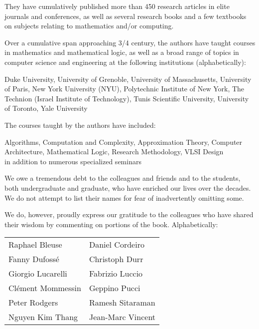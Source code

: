 \medskip

\noindent
They have cumulatively published more than 450 research articles in elite journals and conferences, as well as several research books and a few textbooks on subjects relating to
mathematics and/or computing.

\bigskip

Over a cumulative span approaching 3/4 century, the authors have taught courses in mathematics and mathematical logic, as well as a broad range of topics in computer science and engineering at the following institutions (alphabetically):

\smallskip

\noindent
Duke University, 
University of Grenoble,
University of Massachusetts,
University of Paris,
New York University (NYU),
Polytechnic Institute of New York,
The Technion (Israel Institute of Technology),
Tunis Scientific University,
University of Toronto,
Yale University

\medskip

\noindent
The courses taught by the authors have included:

\smallskip

\noindent
Algorithms,
Computation and Complexity, Approximation Theory,
Computer Architecture,
Mathematical Logic,
Research Methodology,
VLSI Design \\
in addition to numerous specialized seminars

\vspace*{.25in}

\noindent
We owe a tremendous debt to the colleagues and friends and to the students, both undergraduate and graduate, who have enriched our lives over the decades.  We do not attempt to list their names for fear of inadvertently omitting some.

\noindent
We do, however, proudly express our gratitude to the colleagues who have shared their wisdom by commenting on portions of the book.  Alphabetically:

\begin{center}
\begin{tabular}{ll}
Raphael Bleuse & \hspace*{.35in}
Daniel Cordeiro \\
Fanny Dufoss\'{e} & \hspace*{.35in}
Christoph Durr \\
Giorgio Lucarelli & \hspace*{.35in}
Fabrizio Luccio \\
Cl\'{e}ment Mommessin & \hspace*{.35in}
Geppino Pucci \\
Peter Rodgers & \hspace*{.35in}
Ramesh Sitaraman \\
Nguyen Kim Thang & \hspace*{.35in}
Jean-Marc Vincent
\end{tabular}
\end{center}


